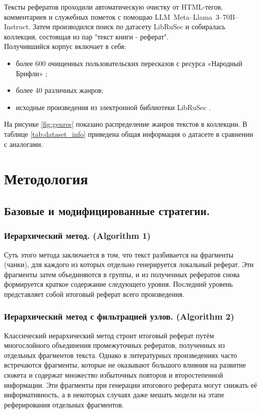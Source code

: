 \documentclass{article}
\begin{document}
Тексты рефератов проходили автоматическую очистку от HTML‑тегов, комментариев и служебных пометок с помощью LLM~Meta--Llama~3--70B--Instruct. 
Затем производился поиск по датасету LibRuSec и собиралась коллекция, состоящая из пар "текст книги - реферат".
\\Получившийся корпус включает в себя:
\begin{itemize}
  \item более 600 очищенных пользовательских пересказов с ресурса «Народный Брифли» \cite{Briefly};
  \item более 40 различных жанров;
  \item исходные произведения из электронной библиотеки LibRuSec \cite{librusec}.
\end{itemize}

На рисунке \ref{fig:genres} показано распределение жанров текстов в коллекции. В таблице \ref{tab:dataset_info} приведена общая информация о датасете в сравнении с аналогами.

\section*{Методология}
\subsection*{Базовые и модифицированные стратегии.}

\subsubsection*{Иерархический метод. (Algorithm 1)}
Суть этого метода \cite{hierarchical} заключается в том, что текст разбивается на фрагменты (чанки), для каждого из
которых отдельно генерируется локальный реферат. 
Эти фрагменты затем объединяются в группы, и из полученных рефератов снова формируется краткое содержание
следующего уровня. Последний уровень представляет собой итоговый реферат всего произведения.

\subsubsection*{Иерархический метод с фильтрацией узлов. (Algorithm 2)}
Классический иерархический метод строит итоговый реферат путём многослойного объединения промежуточных рефератов, полученных из отдельных фрагментов текста. 
Однако в литературных произведениях часто встречаются фрагменты, которые не оказывают большого влияния на развитие сюжета и содержат множество избыточных
повторов и второстепенной информации. Эти фрагменты при генерации итогового реферата могут снижать её информативность, а в некоторых случаях даже мешать модели на этапе реферирования отдельных фрагментов.
\end{document}

